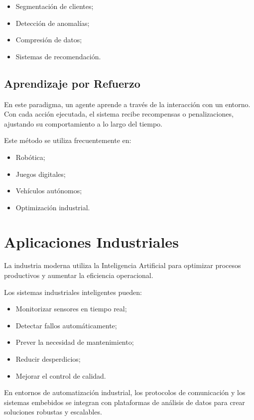 \documentclass[11pt]{article}
\begin{document}
\begin{itemize}
    \item Segmentación de clientes;
    \item Detección de anomalías;
    \item Compresión de datos;
    \item Sistemas de recomendación.
\end{itemize} 

\subsection{Aprendizaje por Refuerzo}

En este paradigma, un agente aprende a través de la interacción con un entorno. Con cada acción
ejecutada, el sistema recibe recompensas o penalizaciones, ajustando su comportamiento a lo
largo del tiempo.

Este método se utiliza frecuentemente en:

\begin{itemize}
    \item Robótica;
    \item Juegos digitales;
    \item Vehículos autónomos;
    \item Optimización industrial.
\end{itemize} 

\section{Aplicaciones Industriales}

La industria moderna utiliza la Inteligencia Artificial para optimizar procesos productivos y aumentar
la eficiencia operacional.

Los sistemas industriales inteligentes pueden:

\begin{itemize}
    \item Monitorizar sensores en tiempo real;
    \item Detectar fallos automáticamente;
    \item Prever la necesidad de mantenimiento;
    \item Reducir desperdicios;
    \item Mejorar el control de calidad.
\end{itemize}

En entornos de automatización industrial, los protocolos de comunicación y los sistemas embebidos se
integran con plataformas de análisis de datos para crear soluciones robustas y escalables.
 
\end{document}
